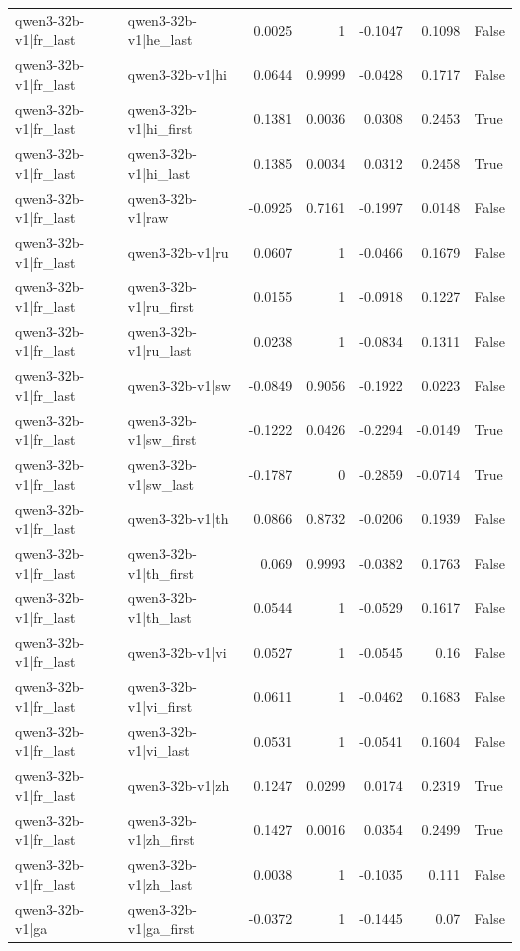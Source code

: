 \begin{table}
\begin{tabular}{l l r r r r l}
qwen3-32b-v1|fr_last & qwen3-32b-v1|he_last & 0.0025 & 1 & -0.1047 & 0.1098 & False \\
qwen3-32b-v1|fr_last & qwen3-32b-v1|hi & 0.0644 & 0.9999 & -0.0428 & 0.1717 & False \\
qwen3-32b-v1|fr_last & qwen3-32b-v1|hi_first & 0.1381 & 0.0036 & 0.0308 & 0.2453 & True \\
qwen3-32b-v1|fr_last & qwen3-32b-v1|hi_last & 0.1385 & 0.0034 & 0.0312 & 0.2458 & True \\
qwen3-32b-v1|fr_last & qwen3-32b-v1|raw & -0.0925 & 0.7161 & -0.1997 & 0.0148 & False \\
qwen3-32b-v1|fr_last & qwen3-32b-v1|ru & 0.0607 & 1 & -0.0466 & 0.1679 & False \\
qwen3-32b-v1|fr_last & qwen3-32b-v1|ru_first & 0.0155 & 1 & -0.0918 & 0.1227 & False \\
qwen3-32b-v1|fr_last & qwen3-32b-v1|ru_last & 0.0238 & 1 & -0.0834 & 0.1311 & False \\
qwen3-32b-v1|fr_last & qwen3-32b-v1|sw & -0.0849 & 0.9056 & -0.1922 & 0.0223 & False \\
qwen3-32b-v1|fr_last & qwen3-32b-v1|sw_first & -0.1222 & 0.0426 & -0.2294 & -0.0149 & True \\
qwen3-32b-v1|fr_last & qwen3-32b-v1|sw_last & -0.1787 & 0 & -0.2859 & -0.0714 & True \\
qwen3-32b-v1|fr_last & qwen3-32b-v1|th & 0.0866 & 0.8732 & -0.0206 & 0.1939 & False \\
qwen3-32b-v1|fr_last & qwen3-32b-v1|th_first & 0.069 & 0.9993 & -0.0382 & 0.1763 & False \\
qwen3-32b-v1|fr_last & qwen3-32b-v1|th_last & 0.0544 & 1 & -0.0529 & 0.1617 & False \\
qwen3-32b-v1|fr_last & qwen3-32b-v1|vi & 0.0527 & 1 & -0.0545 & 0.16 & False \\
qwen3-32b-v1|fr_last & qwen3-32b-v1|vi_first & 0.0611 & 1 & -0.0462 & 0.1683 & False \\
qwen3-32b-v1|fr_last & qwen3-32b-v1|vi_last & 0.0531 & 1 & -0.0541 & 0.1604 & False \\
qwen3-32b-v1|fr_last & qwen3-32b-v1|zh & 0.1247 & 0.0299 & 0.0174 & 0.2319 & True \\
qwen3-32b-v1|fr_last & qwen3-32b-v1|zh_first & 0.1427 & 0.0016 & 0.0354 & 0.2499 & True \\
qwen3-32b-v1|fr_last & qwen3-32b-v1|zh_last & 0.0038 & 1 & -0.1035 & 0.111 & False \\
qwen3-32b-v1|ga & qwen3-32b-v1|ga_first & -0.0372 & 1 & -0.1445 & 0.07 & False \\

\end{tabular}
\end{table}
